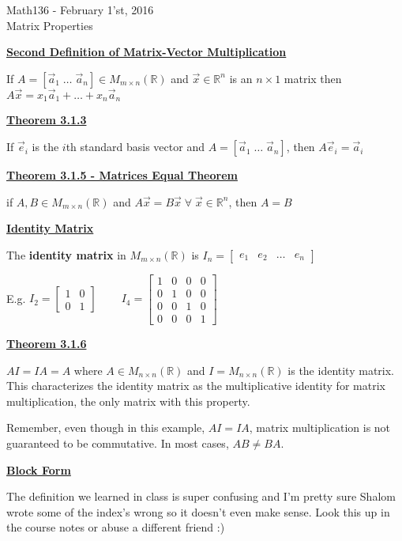 \documentclass{letter}
\newcommand{\0}[1]{\begin{bmatrix}#1\end{bmatrix}}
\newcommand{\h}[1]{\underline{\textbf{#1}}}
\begin{document}
	\begin{center}
		\LARGE Math136 - February 1'st, 2016\\
		\large Matrix Properties
	\end{center}
	\vspace{0.25 in}
	
	\h{Second Definition of Matrix-Vector Multiplication}
	
	If $A = \left[ \vec a_1\; \dots\; \vec a_n\right] \in M_{m\times n} (\mathbb{R})$ and $\vec x \in \mathbb{R}^n$ is an $n \times 1$ matrix then $A \vec x = x_1 \vec a_1 + \dots + x_n \vec a_n$
	
	\h{Theorem 3.1.3} 
	
	If $\vec e_i$ is the $i$th standard basis vector and $A = \left[ \vec a_1\;\dots\; \vec a_n \right]$, then $A\vec e_i = \vec a_i$
	
	\h{Theorem 3.1.5 - Matrices Equal Theorem}
	
	if $A, B \in M_{m\times n} (\mathbb{R})$ and $A \vec x = B \vec x \;\forall\; \vec x \in \mathbb{R}^n$, then $A = B$
	
	
	\h{Identity Matrix}
	
	The \textbf{identity matrix} in $M_{m \times n}(\mathbb{R})$ is $I_n = \0{e_1&e_2&\dots&e_n}$
	
	E.g. $I_2 = \0{1&0\\0&1}\;\;\;\;\;\;\;\;I_4 = \0{1&0&0&0\\0&1&0&0\\0&0&1&0\\0&0&0&1}$
	
	\h{Theorem 3.1.6}
	
	$AI = IA = A$ where $A \in M_{n \times n}(\mathbb{R})$ and $I = M_{n\times n}(\mathbb{R})$ is the identity matrix. This characterizes the identity matrix as the multiplicative identity for matrix multiplication, the only matrix with this property.
	
	Remember, even though in this example, $AI = IA$, matrix multiplication is not guaranteed to be commutative. In most cases, $AB \neq BA$.
	
	\h{Block Form}
	
	The definition we learned in class is super confusing and I'm pretty sure Shalom wrote some of the index's wrong so it doesn't even make sense. Look this up in the course notes or abuse a different friend :)
\end{document}

